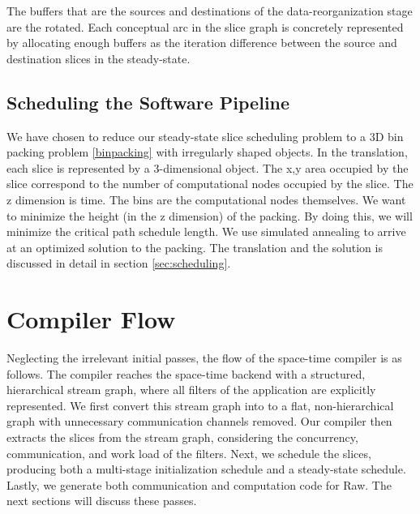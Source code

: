 The buffers that are the sources and destinations of the
data-reorganization stage are the rotated.  Each conceptual arc in the
slice graph is concretely represented by allocating enough buffers as
the iteration difference between the source and destination slices in
the steady-state.

\subsection{Scheduling the Software Pipeline}
We have chosen to reduce our steady-state slice scheduling problem to
a 3D bin packing problem \ref{binpacking} with irregularly shaped
objects.  In the translation, each slice is represented by a
3-dimensional object.  The x,y area occupied by the slice correspond
to the number of computational nodes occupied by the slice. The z
dimension is time.  The bins are the computational nodes themselves.
We want to minimize the height (in the z dimension) of the packing.
By doing this, we will minimize the critical path schedule length.  We
use simulated annealing to arrive at an optimized solution to the
packing.  The translation and the solution is discussed in detail in
section \ref{sec:scheduling}.

\section{Compiler Flow}
Neglecting the irrelevant initial passes, the flow of the space-time
compiler is as follows.  The compiler reaches the space-time backend
with a structured, hierarchical stream graph, where all filters of the
application are explicitly represented.  We first convert this stream
graph into to a flat, non-hierarchical graph with unnecessary
communication channels removed.  Our compiler then extracts the
slices from the stream graph, considering the concurrency,
communication, and work load of the filters.
Next, we schedule the slices, producing both a multi-stage
initialization schedule and a steady-state schedule.  Lastly, we
generate both communication and computation code for Raw.  The next
sections will discuss these passes.